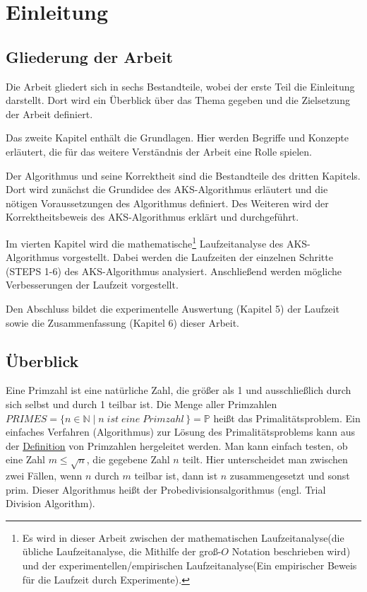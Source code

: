 \documentclass[12pt,oneside]{article}
\theoremstyle{remark}
\theoremstyle{definition}
\begin{document}
\clearpage
{}  
    \setcounter{page}{1}
\lhead{\nouppercase{\leftmark}}


 

\section{Einleitung} \label{einleitung}

\subsection{Gliederung der Arbeit}
Die Arbeit gliedert sich in sechs Bestandteile, wobei der
erste Teil die Einleitung darstellt. Dort wird ein Überblick über das Thema gegeben und die Zielsetzung der Arbeit definiert.

Das zweite Kapitel enthält die Grundlagen. Hier werden Begriffe und Konzepte erläutert, die für das weitere Verständnis der Arbeit eine Rolle spielen. 

Der Algorithmus und seine Korrektheit sind die Bestandteile des dritten Kapitels. Dort wird zunächst die Grundidee des AKS-Algorithmus erläutert und die nötigen Voraussetzungen des Algorithmus definiert. Des Weiteren wird der Korrektheitsbeweis des AKS-Algorithmus erklärt und durchgeführt. 

Im vierten Kapitel wird die mathematische\footnote{Es wird in dieser Arbeit zwischen der mathematischen Laufzeitanalyse(die übliche Laufzeitanalyse, die Mithilfe der groß-$O$ Notation beschrieben wird) und der experimentellen/empirischen Laufzeitanalyse(Ein empirischer Beweis für die Laufzeit durch Experimente).} Laufzeitanalyse des AKS-Algorithmus vorgestellt. Dabei werden die Laufzeiten der einzelnen Schritte (STEPS 1-6) des AKS-Algorithmus analysiert. Anschließend werden mögliche Verbesserungen der Laufzeit vorgestellt. 

Den Abschluss bildet die experimentelle Auswertung (Kapitel 5) der Laufzeit sowie die Zusammenfassung (Kapitel 6) dieser Arbeit. 


\subsection{Überblick}

Eine Primzahl ist eine natürliche Zahl, die größer als 1 und ausschließlich durch sich selbst und durch 1 teilbar ist. Die Menge aller Primzahlen $PRIMES = \{ n \in \mathbb{N} \mid n \; ist \; eine \; Primzahl \, \} = \mathbb{P}$ heißt das Primalitätsproblem. Ein einfaches Verfahren (Algorithmus) zur Lösung des Primalitätsproblems kann aus der \href{https://en.wikipedia.org/wiki/Prime_number}{Definition} von Primzahlen hergeleitet werden. Man kann einfach testen, ob eine Zahl $m \leq \sqrt{n}$, die gegebene Zahl $n$ teilt. Hier unterscheidet man zwischen zwei Fällen, wenn $n$ durch $m$ teilbar ist, dann ist $n$ zusammengesetzt und sonst prim. Dieser Algorithmus heißt der Probedivisionsalgorithmus (engl. Trial Division Algorithm).
\end{document}
